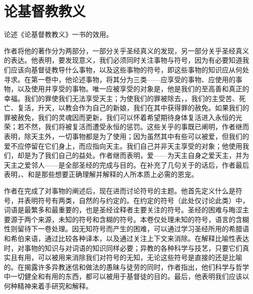 
\chapter{论基督教教义}


\par

 论述《论基督教教义》一书的效用。\par

 作者将他的著作分为两部分，一部分关乎圣经真义的发现，另一部分关乎圣经真义的表达。他表明，要发现意义，我们必须同时关注事物与符号，因为有必要知道我们应该向基督徒教导什么事物，以及这些事物的符号，即这些事物的知识应从何处寻求。在第一卷中，他论述事物，将其分为三类——应享受的事物、应使用的事物，以及使用并享受的事物。唯一应被享受的对象是，他是我们的至高善和真正的幸福。我们的罪使我们无法享受天主；为使我们的罪被除去，，我们的主受苦、死亡、复活，升天，以教会作为自己的新娘，我们在其中获得罪的赦免。如果我们的罪被赦免，我们的灵魂因而更新，我们可以怀着希望期待身体复活进入永恒的光荣；若不然，我们将被复活而遭受永恒的惩罚。这些关乎的事既已阐明，作者继而表明，除天主外，一切事物都是为了使用；因为虽然其中有些可以被爱，但我们的爱不应停留在它们身上，而应指向天主。我们自己并非天主享受的对象；他使用我们，却是为了我们自己的益处。作者继而表明，爱——为天主自身之爱天主，并为天主之爱邻人——是全部圣经的完成与目的。在补充了几句关于的话后，作者最后表明，、和是那些想要正确理解并解释的人所本质上必需的恩宠。\par

 作者在完成了对事物的阐述后，现在进而讨论符号的主题。他首先定义什么是符号，并表明符号有两类，自然的与约定的。在约定的符号（此处仅讨论此类）中，词语是最繁多和最重要的，也是圣经诠释者主要关注的符号。圣经的困难与晦涩主要源于两个来源，未知的符号和含糊的符号。本卷仅处理未知的符号，语言的含糊性则留待下一卷处理。因无知符号而产生的困难，可以通过学习圣经所用的希腊语和希伯来语，通过比较各种译本，以及通过关注上下文来消除。在解释比喻性表达时，对事物的知识与对词语的知识同样必要；异教的各种科学与技艺，只要它们真实且有用，可以被用来消除我们对符号的无知，无论这些符号是直接的还是比喻的。在揭露许多异教迷信和做法的愚昧与徒劳的同时，作者指出，他们科学与哲学中一切健全和有用的东西，都可以被用于基督徒的目的。最后，他表明我们应该以何种精神来着手研究和解释。\par

